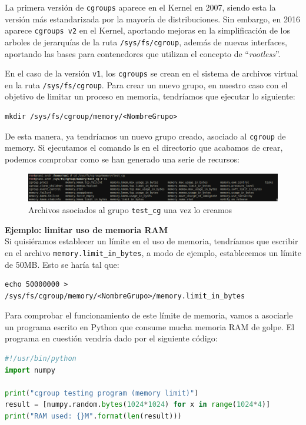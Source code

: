\documentclass[12pt]{article}
\begin{document}
	\noindent La primera versión de \texttt{cgroups} aparece en el Kernel en 2007, siendo esta la versión más estandarizada por la mayoría de distribuciones. Sin embargo, en 2016 aparece \texttt{cgroups v2} en el Kernel, aportando mejoras en la simplificación de los arboles de jerarquías de la ruta \texttt{/sys/fs/cgroup}, además de nuevas interfaces, aportando las bases para contenedores que utilizan el concepto de ``\textit{rootless}''. \\
	
	\par \noindent En el caso de la versión \texttt{v1}, los \texttt{cgroups} se crean en el sistema de archivos virtual en la ruta \texttt{/sys/fs/cgroup}. Para crear un nuevo grupo, en nuestro caso con el objetivo de limitar un proceso en memoria, tendríamos que ejecutar lo siguiente:
	\begin{verbatim}
mkdir /sys/fs/cgroup/memory/<NombreGrupo>
	\end{verbatim}

	\noindent De esta manera, ya tendríamos un nuevo grupo creado, asociado al \texttt{cgroup} de memory. Si ejecutamos el comando ls en el directorio que acabamos de crear, podemos comprobar como se han generado una serie de recursos: 
	
	\begin{figure}[h!]
		\begin{center}
			\includegraphics[width=1\textwidth]{img/cgroup_memory_ls.png}
			\caption{Archivos asociados al grupo \texttt{test\_cg} una vez lo creamos}
		\end{center}
	\end{figure}

	\pagebreak
	
	\noindent \textbf{\large Ejemplo: limitar uso de memoria RAM}\\
	
	\noindent Si quisiéramos establecer un límite en el uso de memoria, tendríamos que escribir en el archivo \texttt{memory.limit\_in\_bytes}, a modo de ejemplo, establecemos un límite de 50MB. Esto se haría tal que:
	\begin{verbatim}
echo 50000000 > /sys/fs/cgroup/memory/<NombreGrupo>/memory.limit_in_bytes
	\end{verbatim}

	\noindent Para comprobar el funcionamiento de este límite de memoria, vamos a asociarle un programa escrito en Python que consume mucha memoria RAM de golpe. El programa en cuestión vendría dado por el siguiente código:
	\begin{lstlisting}[language=Python, caption={Programa en Python que consume 4 GB de RAM}]
#!/usr/bin/python
import numpy

print("cgroup testing program (memory limit)")
result = [numpy.random.bytes(1024*1024) for x in range(1024*4)]
print("RAM used: {}M".format(len(result)))
	\end{lstlisting}
\end{document}

